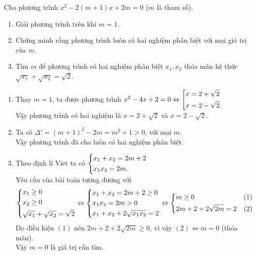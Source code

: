 \begin{ex}%
    Cho phương trình $x^2-2(m+1)x+2m=0$ ($m$ là tham số).
    \begin{enumerate}
        \item Giải phương trình trên khi $m=1$.
        \item Chứng minh rằng phương trình luôn có hai nghiệm phân biệt với mọi giá trị của $m$.
        \item Tìm $m$ để phương trình có hai nghiệm phân biệt $x_1, x_2$ thỏa mãn hệ thức $\sqrt{x_1}+\sqrt{x_2}=\sqrt{2}$.
    \end{enumerate}
\loigiai
    {
    \begin{enumerate}
        \item Thay $m=1$, ta được phương trình $x^2-4x+2=0\Leftrightarrow \left[\begin{aligned}x&=2+\sqrt{2}\\ x&=2-\sqrt{2}.\end{aligned}\right.$\\
       		Vậy phương trình có hai nghiệm là $x=2+\sqrt{2}$ và $x=2-\sqrt{2}.$
        \item Ta có $\Delta'=(m+1)^2-2m=m^2+1 > 0$, với mọi $m$. \\
        	Vậy phương trình đã cho luôn có hai nghiệm phân biệt.
        \item Theo định lí Viet ta có $\left\{\begin{aligned}&x_1+x_2=2m+2 \\ & x_1x_2=2m.\end{aligned}\right.$\\
        Yêu cầu của bài toán tương đương với
        $$\left\{\begin{aligned}&x_1\ge 0\\ &x_2\ge 0\\ &\sqrt{x_1}+\sqrt{x_2}=\sqrt{2}\end{aligned}\right.\Leftrightarrow \left\{\begin{aligned}& x_1+x_2 = 2m+2 \ge 0 \\ &x_1x_2=2m>0 \\ &x_1+x_2+2\sqrt{x_1x_2}=2\end{aligned}\right.\Leftrightarrow \left\{\begin{aligned}&m\ge 0 & (1)\\ & 2m+2+2\sqrt{2m}=2 & (2)\end{aligned}\right.$$
        Do điều kiện $(1)$ nên $2m+2+2\sqrt{2m}\ge 0$, vì vậy $(2) \Leftrightarrow m=0$ (thỏa mãn).\\
        Vậy $m=0$ là giá trị cần tìm.
    \end{enumerate}
    }
\end{ex}

